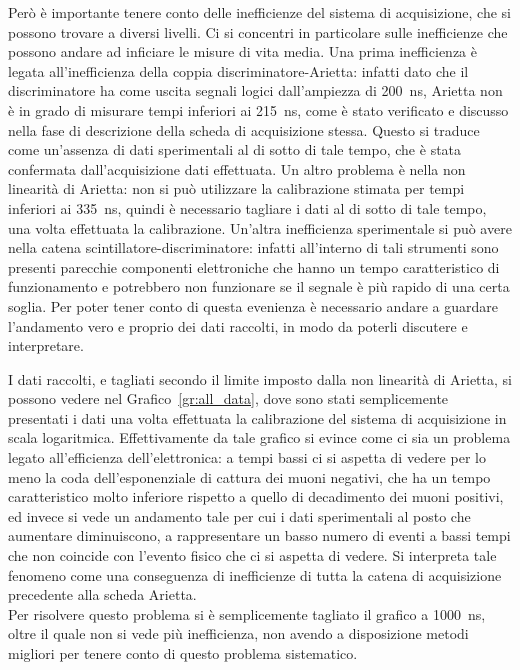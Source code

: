 Però è importante tenere conto delle inefficienze del sistema di acquisizione, che si possono trovare a diversi livelli. Ci si concentri in particolare sulle inefficienze che possono andare ad inficiare le misure di vita media. Una prima inefficienza è legata all'inefficienza della coppia discriminatore-Arietta: infatti dato che il discriminatore ha come uscita segnali logici dall'ampiezza di 200~ns, Arietta non è in grado di misurare tempi inferiori ai 215~ns, come è stato verificato e discusso nella fase di descrizione della scheda di acquisizione stessa. Questo si traduce come un'assenza di dati sperimentali al di sotto di tale tempo, che è stata confermata dall'acquisizione dati effettuata. Un altro problema è nella non linearità di Arietta: non si può utilizzare la calibrazione stimata per tempi inferiori ai 335~ns, quindi è necessario tagliare i dati al di sotto di tale tempo, una volta effettuata la calibrazione. Un'altra inefficienza sperimentale si può avere nella catena scintillatore-discriminatore: infatti all'interno di tali strumenti sono presenti parecchie componenti elettroniche che hanno un tempo caratteristico di funzionamento e potrebbero non funzionare se il segnale è più rapido di una certa soglia. Per poter tener conto di questa evenienza è necessario andare a guardare l'andamento vero e proprio dei dati raccolti, in  modo da poterli discutere e interpretare.\\

I dati raccolti, e tagliati secondo il limite imposto dalla non linearità di Arietta, si possono vedere nel Grafico~\ref{gr:all_data}, dove sono stati semplicemente presentati i dati una volta effettuata la calibrazione del sistema di acquisizione in scala logaritmica. Effettivamente da tale grafico si evince  come ci sia un problema legato all'efficienza dell'elettronica: a tempi bassi ci si aspetta di vedere per lo meno la coda dell'esponenziale di cattura dei muoni negativi, che ha un tempo caratteristico molto inferiore rispetto a quello di decadimento dei muoni positivi, ed invece si vede un andamento tale per cui i dati sperimentali al posto che aumentare diminuiscono, a rappresentare un basso numero di eventi a bassi tempi che non coincide con l'evento fisico che ci si aspetta di vedere. Si interpreta tale fenomeno come una conseguenza di inefficienze di tutta la catena di acquisizione precedente alla scheda Arietta.\\

Per risolvere questo problema si è semplicemente tagliato il grafico a 1000~ns, oltre il quale non si vede più inefficienza, non avendo a disposizione metodi migliori per tenere conto di questo problema sistematico.\\

